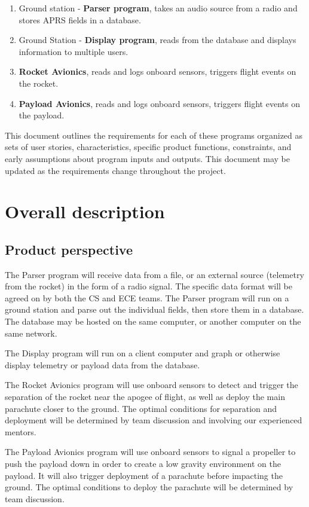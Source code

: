 \documentclass[onecolumn, draftclsnofoot, 10pt, compsoc]{IEEEtran}
\begin{document}
\begin{enumerate}
\item Ground station - \textbf{Parser program}, takes an audio source from a radio and stores APRS fields in a database.
\item Ground Station - \textbf{Display program}, reads from the database and displays information to multiple users.
\item \textbf{Rocket Avionics}, reads and logs onboard sensors, triggers flight events on the rocket.
\item \textbf{Payload Avionics}, reads and logs onboard sensors, triggers flight events on the payload.
\end{enumerate}

This document outlines the requirements for each of these programs organized as sets of user stories, characteristics, specific product functions, constraints, and early assumptions about program inputs and outputs. This document may be updated as the requirements change throughout the project.

\section{Overall description}
\subsection{Product perspective}
The Parser program will receive data from a file, or an external source (telemetry from the rocket) in the form of a radio signal. The specific data format will be agreed on by both the CS and ECE teams.  The Parser program will run on a ground station and parse out the individual fields, then store them in a database. The database may be hosted on the same computer, or another computer on the same network.

The Display program will run on a client computer and graph or otherwise display telemetry or payload data from the database.

The Rocket Avionics program will use onboard sensors to detect and trigger the separation of the rocket near the apogee of flight, as well as deploy the main parachute closer to the ground.  The optimal conditions for separation and deployment will be determined by team discussion and involving our experienced mentors.

The Payload Avionics program will use onboard sensors to signal a propeller to push the payload down in order to create a low gravity environment on the payload. It will also trigger deployment of a parachute before impacting the ground.  The optimal conditions to deploy the parachute will be determined by team discussion.
\end{document}
